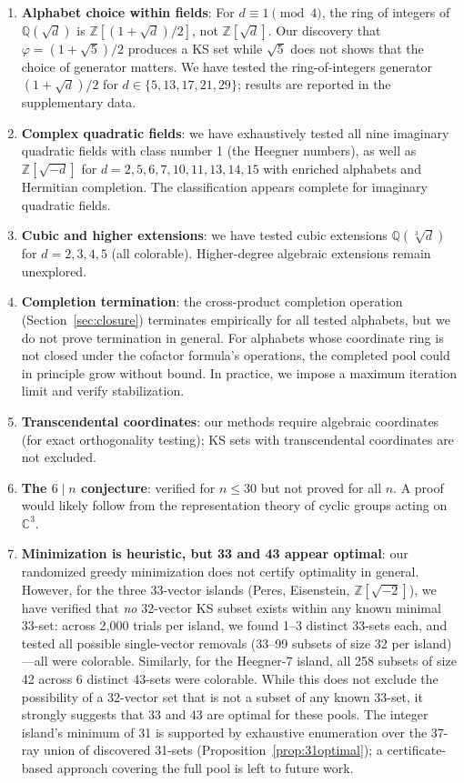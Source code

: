 \documentclass[12pt,a4paper]{article}
\newcommand{\C}{\mathbb{C}}
\newcommand{\Z}{\mathbb{Z}}
\newcommand{\Q}{\mathbb{Q}}
\begin{document}
\begin{enumerate}
    \item \textbf{Alphabet choice within fields}: For $d \equiv 1 \pmod{4}$, the ring of integers of $\Q(\sqrt{d})$ is $\Z[(1+\sqrt{d})/2]$, not $\Z[\sqrt{d}]$. Our discovery that $\varphi = (1+\sqrt{5})/2$ produces a KS set while $\sqrt{5}$ does not shows that the choice of generator matters. We have tested the ring-of-integers generator $(1+\sqrt{d})/2$ for $d \in \{5, 13, 17, 21, 29\}$; results are reported in the supplementary data.
    \item \textbf{Complex quadratic fields}: we have exhaustively tested all nine imaginary quadratic fields with class number 1 (the Heegner numbers), as well as $\Z[\sqrt{-d}]$ for $d = 2, 5, 6, 7, 10, 11, 13, 14, 15$ with enriched alphabets and Hermitian completion. The classification appears complete for imaginary quadratic fields.
    \item \textbf{Cubic and higher extensions}: we have tested cubic extensions $\Q(\sqrt[3]{d})$ for $d = 2, 3, 4, 5$ (all colorable). Higher-degree algebraic extensions remain unexplored.
    \item \textbf{Completion termination}: the cross-product completion operation (Section~\ref{sec:closure}) terminates empirically for all tested alphabets, but we do not prove termination in general. For alphabets whose coordinate ring is not closed under the cofactor formula's operations, the completed pool could in principle grow without bound. In practice, we impose a maximum iteration limit and verify stabilization.
    \item \textbf{Transcendental coordinates}: our methods require algebraic coordinates (for exact orthogonality testing); KS sets with transcendental coordinates are not excluded.
    \item \textbf{The $6 \mid n$ conjecture}: verified for $n \leq 30$ but not proved for all $n$. A proof would likely follow from the representation theory of cyclic groups acting on $\C^3$.
    \item \textbf{Minimization is heuristic, but 33 and 43 appear optimal}: our randomized greedy minimization does not certify optimality in general. However, for the three 33-vector islands (Peres, Eisenstein, $\Z[\sqrt{-2}]$), we have verified that \emph{no} 32-vector KS subset exists within any known minimal 33-set: across 2{,}000 trials per island, we found 1--3 distinct 33-sets each, and tested all possible single-vector removals (33--99 subsets of size 32 per island)---all were colorable. Similarly, for the Heegner-7 island, all 258 subsets of size 42 across 6 distinct 43-sets were colorable. While this does not exclude the possibility of a 32-vector set that is not a subset of any known 33-set, it strongly suggests that 33 and 43 are optimal for these pools. The integer island's minimum of 31 is supported by exhaustive enumeration over the 37-ray union of discovered 31-sets (Proposition~\ref{prop:31optimal}); a certificate-based approach covering the full pool is left to future work.

\end{enumerate}
\end{document}
